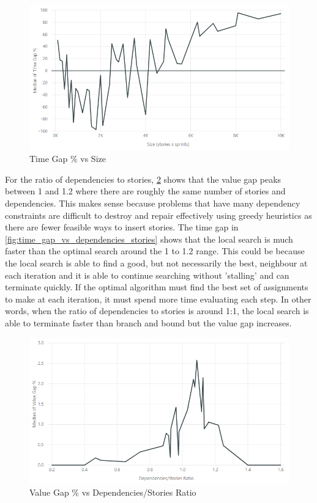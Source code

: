 \begin{figure}[h!]
    \centering
    \includegraphics[width=\textwidth]{Figures/Results/annealing_time_gap_size.png}
    \caption{Time Gap \% vs Size}
    \label{fig:time_gap_vs_size}
\end{figure}

For the ratio of dependencies to stories, \cref{fig:value_gap_vs_dependencies_stories} shows that the value gap peaks between 1 and 1.2 where there are roughly the same number of stories and dependencies. This makes sense because problems that have many dependency constraints are difficult to destroy and repair effectively using greedy heuristics as there are fewer feasible ways to insert stories. The time gap in \cref{fig:time_gap_vs_dependencies_stories} shows that the local search is much faster than the optimal search around the 1 to 1.2 range. This could be because the local search is able to find a good, but not necessarily the best, neighbour at each iteration and it is able to continue searching without 'stalling' and can terminate quickly. If the optimal algorithm must find the best set of assignments to make at each iteration, it must spend more time evaluating each step. In other words, when the ratio of dependencies to stories is around 1:1, the local search is able to terminate faster than branch and bound but the value gap increases.

\begin{figure}[h!]
    \centering
    \includegraphics[width=\textwidth]{Figures/Results/annealing_value_gap_dependencies_stories.png}
    \caption{Value Gap \% vs Dependencies/Stories Ratio}
    \label{fig:value_gap_vs_dependencies_stories}
\end{figure}

